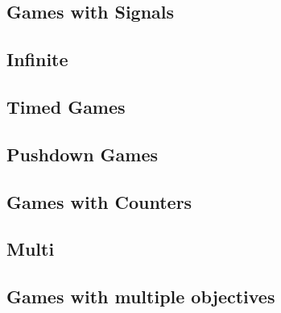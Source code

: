 \documentclass[graybox,envcountchap]{svmono}
\begin{document}

\chapter{Games with Signals}
\label{8-chap:signal}


\begin{partbacktext}
\part{Infinite}
\label{part:infinite}
\end{partbacktext}


\chapter{Timed Games}
\label{9-chap:timed}


\chapter{Pushdown Games}
\label{10-chap:pushdown}


\chapter{Games with Counters}
\label{11-chap:counters}


\begin{partbacktext}
\part{Multi}
\label{part:multi}
\end{partbacktext}


\chapter{Games with multiple objectives}
\label{12-chap:multiobjective}
\end{document}
